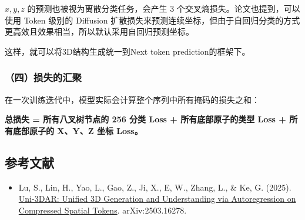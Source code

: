 \(x,y,z\) 的预测也被视为离散分类任务，会产生 3 个交叉熵损失。论文也提到，可以使用 Token 级别的 Diffusion 扩散损失来预测连续坐标，但由于自回归分类的方式更高效且效果相当，所以默认采用自回归预测坐标。

这样，就可以将3D结构生成统一到Next token prediction的框架下。

\hypertarget{ux56dbux635fux5931ux7684ux6c47ux805a}{%
\subsubsection{（四）损失的汇聚}\label{ux56dbux635fux5931ux7684ux6c47ux805a}}

在一次训练迭代中，模型实际会计算整个序列中所有掩码的损失之和：

\textbf{总损失 = 所有八叉树节点的 256 分类 Loss + 所有底部原子的类型 Loss + 所有底部原子的 X、Y、Z 坐标 Loss。}

\hypertarget{ux53c2ux8003ux6587ux732e-202}{%
\subsection{参考文献}\label{ux53c2ux8003ux6587ux732e-202}}

\begin{itemize}
\tightlist
\item
  Lu, S., Lin, H., Yao, L., Gao, Z., Ji, X., E, W., Zhang, L., \& Ke, G. (2025). \href{https://arxiv.org/abs/2503.16278}{Uni-3DAR: Unified 3D Generation and Understanding via Autoregression on Compressed Spatial Tokens}. arXiv:2503.16278.
\end{itemize}

\clearpage

